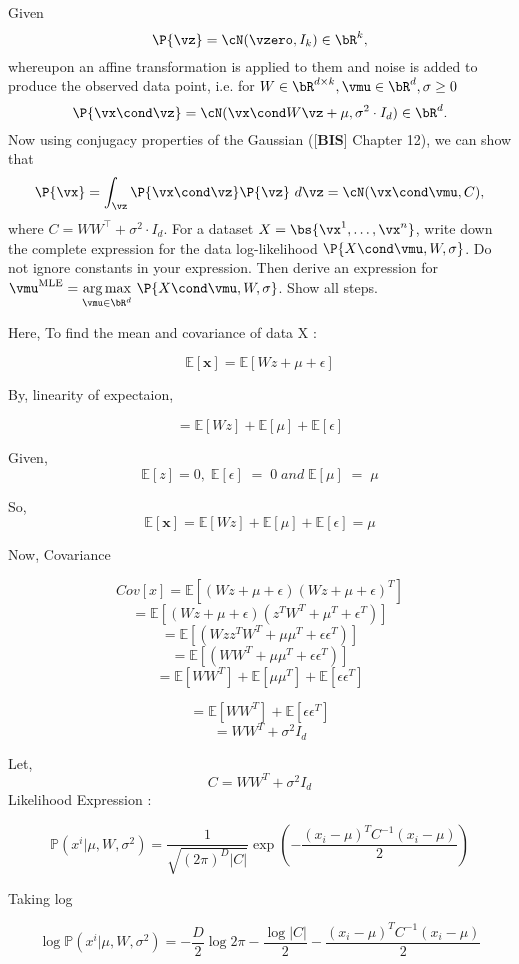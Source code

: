 \documentclass[a4paper,11pt]{article}
\begin{document}
\begin{mlsolution}

Given
\[
\P{\vz} = \cN(\vzero,I_k) \in \bR^k,
\]
whereupon an affine transformation is applied to them and noise is added to produce the observed data point, i.e. for $W \in \bR^{d\times k}, \vmu \in \bR^d, \sigma \geq 0$
\[
\P{\vx\cond\vz} = \cN(\vx\cond W\vz+\mu, \sigma^2\cdot I_d) \in \bR^d.
\]
Now using conjugacy properties of the Gaussian ([\textbf{BIS}] Chapter 12), we can show that
\[
\P{\vx} = \int_{\vz}\P{\vx\cond\vz}\P{\vz}\ d\vz = \cN(\vx\cond\vmu,C),
\]
where $C = WW^\top + \sigma^2\cdot I_d$. For a dataset $X = \bs{\vx^1,\ldots,\vx^n}$, write down the complete expression for the data log-likelihood $\P{X\cond\vmu,W,\sigma}$. Do not ignore constants in your expression. Then derive an expression for $\vmu^{\text{MLE}} = \underset{\vmu\in\bR^d}{\arg\max}\ \P{X\cond\vmu,W,\sigma}$. Show all steps. 

Here, To find the mean and covariance of data X :

\[
\mathbb{E}[\textbf{x}] = \mathbb{E}[Wz + \mu + \epsilon]
\]

By, linearity of expectaion,

\[
 =  \mathbb{E}[Wz] + \mathbb{E}[\mu] + \mathbb{E}[\epsilon] 
\]

Given,
\[
\mathbb{E}[z] = 0,\; \mathbb{E}[\epsilon]\; =\; 0 \;and \;\mathbb{E}[\mu]\; = \;\mu 
\]

So, 
\[
\mathbb{E}[\textbf{x}] =  \mathbb{E}[Wz] + \mathbb{E}[\mu] + \mathbb{E}[\epsilon] = \mu
\]

Now, Covariance 

\[
Cov[x] = \mathbb{E}[(Wz + \mu + \epsilon)(Wz + \mu + \epsilon)^T]
\]
\[
=  \mathbb{E}[(Wz + \mu + \epsilon)(z^TW^T + \mu^T + \epsilon^T)]
\]
\[
=  \mathbb{E}[(Wzz^TW^T + \mu\mu^T + \epsilon\epsilon^T)]
\]
\[
=  \mathbb{E}[(WW^T + \mu\mu^T + \epsilon\epsilon^T)]
\]
\[
=  \mathbb{E}[WW^T] + \mathbb{E}[\mu\mu^T] + \mathbb{E}[\epsilon\epsilon^T]
\]

\[
=  \mathbb{E}[WW^T] + \mathbb{E}[\epsilon\epsilon^T]
\]
\[
=  WW^T + \sigma^2I_d
\]

Let,
 \[
    C = WW^T + \sigma^2I_d
 \]
Likelihood Expression : 

\[
\mathbb{P}(x^i | \mu, W, \sigma^2) = \frac{1}{\sqrt{(2\pi)^D |C|}} \exp\left ( -\frac{(x_i - \mu)^TC^{-1}(x_i - \mu)}{2} \right )
\]

Taking log 

\[
\log\mathbb{P}(x^i | \mu, W, \sigma^2) = -\frac{D}{2}\log2\pi - \frac{\log|C|}{2}   -\frac{(x_i - \mu)^TC^{-1}(x_i - \mu)}{2}
\]


\end{mlsolution}
\end{document}
